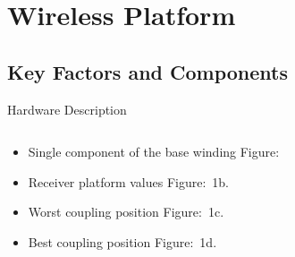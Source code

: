 \section{Wireless Platform}
\label{sec:wireless}
  \subsection{Key Factors and Components}

\begin{frame}{Hardware Description}
    \begin{columns}[t] %
      \begin{column}[T]{5cm} %
        \begin{itemize}
            \item<+-| alert@+> Single component of the base winding Figure:%
            \item<+-| alert@+> Receiver platform values Figure:~1b.
            \item<+-| alert@+> Worst coupling position Figure:~1c.
            \item<+-| alert@+> Best coupling position Figure:~1d.
          \end{itemize}  
      \end{column}
    \begin{column}[T]{5cm} %
      \begin{figure}
\end{figure}
\end{column}
\end{columns}
\end{frame}
